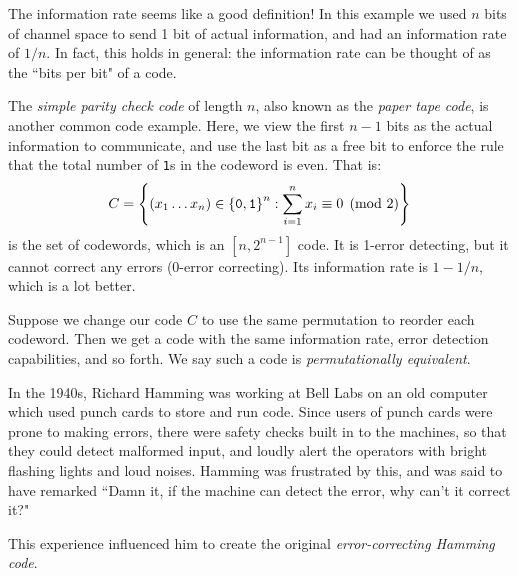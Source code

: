 \documentclass{article}
\begin{document}
\begin{note}
	The information rate seems like a good definition!
	In this example we used $n$ bits of channel space
	to send 1 bit of actual information,
	and had an information rate of $1/n$.
	In fact, this holds in general:
	the information rate can be thought of as the ``bits per bit" of a code.
\end{note}

\begin{example}
    The \textit{simple parity check code} of length $n$,
    also known as the \textit{paper tape code},
    is another common code example.
    Here, we view the first $n-1$ bits as the actual information to communicate,
    and use the last bit as a free bit to enforce the rule that
    the total number of \texttt{1}s in the codeword is even. That is:
    \[
	C = \left\lbrace (x_1 \dots x_n) \in \left\lbrace \texttt{0}, \texttt{1} \right\rbrace^n : \sum_{i=1}^n x_i \equiv 0 \pmod 2 \right\rbrace
	\]
	is the set of codewords, which is an $[n, 2^{n-1}]$ code.
	It is 1-error detecting,
	but it cannot correct any errors (0-error correcting).
	Its information rate is $1 - 1/n$, which is a lot better.
\end{example}

\begin{note}
	Suppose we change our code $C$
	to use the same permutation to reorder each codeword.
	Then we get a code with the same information rate,
	error detection capabilities, and so forth.
	We say such a code is \textit{permutationally equivalent}.
\end{note}

In the 1940s, Richard Hamming was working at Bell Labs on an old computer which used punch cards to store and run code. Since users of punch cards were prone to making errors, there were safety checks built in to the machines, so that they could detect malformed input, and loudly alert the operators with bright flashing lights and loud noises. Hamming was frustrated by this, and was said to have remarked ``Damn it, if the machine can detect the error, why can't it correct it?"

This experience influenced him to create the original
\textit{error-correcting Hamming code}.
\end{document}
